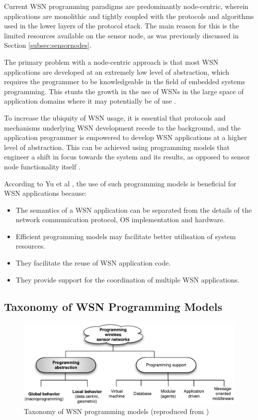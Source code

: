 Current WSN programming paradigms are predominantly node-centric, wherein
applications are monolithic and tightly coupled with the protocols and algorithms
used in the lower layers of the protocol stack. 
The main reason for this is the limited resources available on the sensor node, as
was previously discussed in Section \ref{subsec:sensornodes}.

The primary problem with a node-centric approach is that most WSN applications
are developed at an extremely low level of abstraction, which requires the programmer to be knowledgeable in the field of
embedded systems programming. This stunts the growth in the use of WSNs in the
large space of application domains where it may potentially be of use
\cite{mottola_middleware:2008}. 

To increase the ubiquity of WSN
usage, it is essential that protocols and mechanisms underlying WSN
development recede to the background, and the application programmer is
empowered to develop WSN applications at a higher level of abstraction. This
can be achieved using programming models that engineer a shift in focus
towards the system and its results, as opposed to sensor node functionality
itself \cite{mottola_middleware:2008}. 

According to Yu et al \cite{yu_issuesMiddleware:2004}, the use of such
programming models is beneficial for WSN applications because:
\begin{itemize}
\item The semantics of a WSN application can be separated from the details of 
the network communication protocol, OS implementation and hardware.
\item Efficient programming models may facilitate better utilisation of system 
resources.
\item They facilitate the reuse of WSN application code.
\item They provide support for the coordination of multiple WSN applications.
\end{itemize}

\subsection{Taxonomy of WSN Programming Models}

\begin{figure}
\centering
\includegraphics[width=\textwidth]{img/ProgrammingAbstractions.eps} 
\caption[Taxonomy of WSN programming models]{Taxonomy of WSN programming models (reproduced from
\cite{hadim_middleware:2006})}
\label{Fig:ProgrammingModels}
\end{figure}

